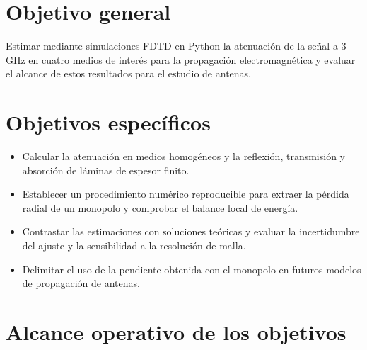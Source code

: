 

\section{Objetivo general}
Estimar mediante simulaciones FDTD en Python la atenuación de la señal a 3 GHz en cuatro medios de interés para la propagación electromagnética y evaluar el alcance de estos resultados para el estudio de antenas.

\section{Objetivos específicos}
\begin{itemize}
\item Calcular la atenuación en medios homogéneos y la reflexión, transmisión y absorción de láminas de espesor finito.
\item Establecer un procedimiento numérico reproducible para extraer la pérdida radial de un monopolo y comprobar el balance local de energía.
\item Contrastar las estimaciones con soluciones teóricas y evaluar la incertidumbre del ajuste y la sensibilidad a la resolución de malla.
\item Delimitar el uso de la pendiente obtenida con el monopolo en futuros modelos de propagación de antenas.

\end{itemize}
\section{Alcance operativo de los objetivos}

